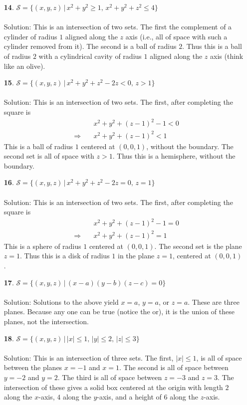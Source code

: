 \documentclass[12pt]{amsbook}
\let\cal\mathcal
\begin{document}
\begin{enumerate}
\\
  \item[{\small\bf 14}.]
 ${\cal S}=\{(x,y,z)\,|\, x^2+y^2\geq 1,\, x^2+y^2+z^2\leq 4\}$ \\
\\
{\sc Solution}: This is an intersection of two sets. The first the complement of a cylinder of radius $1$ aligned along the $z$ axis (i.e., all of space with such a cylinder removed from it). The second is a ball of radius $2$. Thus this is a ball of radius $2$ with a cylindrical cavity of radius $1$ aligned along the $z$ axis (think like an olive).
\\
  \item[{\small\bf 15}.] ${\cal S}=\{(x,y,z)\,|\, x^2+y^2+z^2-2z<0,\, z>1\}$ \\
\\
{\sc Solution}: This is an intersection of two sets. The first, after completing the square is
\begin{eqnarray*}
&&\quad x^2+y^2+(z-1)^2-1<0\\
&\Rightarrow&\quad
x^2+y^2+(z-1)^2<1
\end{eqnarray*}
This is a ball of radius $1$ centered at $(0,0,1)$, without the boundary. The second set is all of space with $z>1$. Thus this is a hemisphere, without the boundary. 
\\
  \item[{\small\bf 16}.]  ${\cal S}=\{(x,y,z)\,|\, x^2+y^2+z^2-2z=0, \, z=1\}$ \\
\\
{\sc Solution}: This is an intersection of two sets. The first, after completing the square is
\begin{eqnarray*}
&&\quad x^2+y^2+(z-1)^2-1=0\\
&\Rightarrow&\quad
x^2+y^2+(z-1)^2=1
\end{eqnarray*}
This is a sphere of radius $1$ centered at $(0,0,1)$. The second set is the plane $z=1$. Thus this is a disk of radius $1$ in the plane $z=1$, centered at $(0,0,1)$. 
\\
  \item[{\small\bf 17}.] ${\cal S}=\{(x,y,z)\,|\, (x-a)(y-b)(z-c)=0\}$ \\
\\
{\sc Solution}: Solutions to the above yield $x=a$, $y=a$, or $z=a$. These are three planes. Because any one can be true (notice the or), it is the union of these planes, not the intersection.
\\
  \item[{\small\bf 18}.] ${\cal S}=\{(x,y,z)\,|\, |x|\leq 1, \, |y|\leq 2,\, 
 |z|\leq 3\}$ \\
\\
{\sc Solution}: This is an intersection of three sets. The first, $|x|\leq 1$, is all of space between the planes $x=-1$ and $x=1$. The second is all of space between $y=-2$ and $y=2$. The third is all of space between $z=-3$ and $z=3$. The intersection of these gives a solid box centered at the origin with length $2$ along the $x$-axis, $4$ along the $y$-axis, and a height of $6$ along the $z$-axis.
\\
\end{enumerate}
\end{document}
